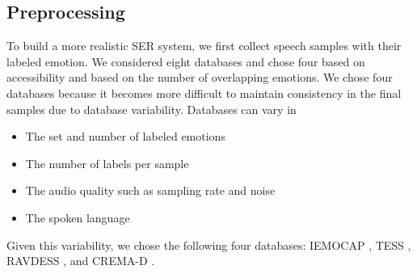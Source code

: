 \documentclass[a4paper, 10pt, conference]{ieeeconf}      %
\begin{document}
\subsection{Preprocessing} \label{Preprocessing}


To build a more realistic SER system, we first collect speech samples with their labeled emotion. We considered eight databases and chose four based on accessibility and based on the number of overlapping emotions. We chose four databases because it becomes more difficult to maintain consistency in the final samples due to database variability. Databases can vary in
\begin{itemize}
	\item The set and number of labeled emotions
	\item The number of labels per sample
	\item The audio quality such as sampling rate and noise
	\item The spoken language
\end{itemize}
Given this variability, we chose the following four databases: IEMOCAP \cite{busso_2008}, TESS \cite{dupuis_2011}, RAVDESS \cite{livingstone_2018}, and CREMA-D \cite{cao_2014}.
\end{document}
